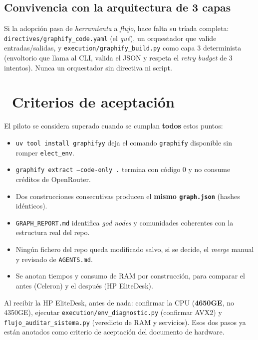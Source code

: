 \documentclass[11pt,a4paper]{article}
\newcommand{\iconotexto}[2]{\textcolor{cyanNeon}{\faIcon{#1}}~#2}
\begin{document}
\subsection{Convivencia con la arquitectura de 3 capas}

\begin{cajaReto}
Si la adopción pasa de \emph{herramienta} a \emph{flujo}, hace falta su tríada
completa: \texttt{directives/graphify\_code.yaml} (el \emph{qué}),
un orquestador que valide entradas/salidas, y \texttt{execution/graphify\_build.py}
como capa 3 determinista (envoltorio que llama al CLI, valida el JSON y respeta el
\emph{retry budget} de 3 intentos). Nunca un orquestador sin directiva ni script.
\end{cajaReto}

\section[Criterios de aceptación]{\iconotexto{clipboard-check}{Criterios de aceptación}}

El piloto se considera superado cuando se cumplan \textbf{todos} estos puntos:

\begin{itemize}[leftmargin=1.4em]
    \item \texttt{uv tool install graphifyy} deja el comando \texttt{graphify}
    disponible sin romper \texttt{elect\_env}.
    \item \texttt{graphify extract --code-only .} termina con código 0 y no consume
    créditos de OpenRouter.
    \item Dos construcciones consecutivas producen el \textbf{mismo \texttt{graph.json}}
    (hashes idénticos).
    \item \texttt{GRAPH\_REPORT.md} identifica \emph{god nodes} y comunidades coherentes
    con la estructura real del repo.
    \item Ningún fichero del repo queda modificado salvo, si se decide, el \emph{merge}
    manual y revisado de \texttt{AGENTS.md}.
    \item Se anotan tiempos y consumo de RAM por construcción, para comparar el antes
    (Celeron) y el después (HP EliteDesk).
\end{itemize}

\begin{cajaRecuerda}
Al recibir la HP EliteDesk, antes de nada: confirmar la CPU (\textbf{4650GE}, no 4350GE),
ejecutar \texttt{execution/env\_diagnostic.py} (confirmar AVX2) y
\texttt{flujo\_auditar\_sistema.py} (veredicto de RAM y servicios). Esos dos pasos ya
están anotados como criterio de aceptación del documento de hardware.
\end{cajaRecuerda}
\end{document}
